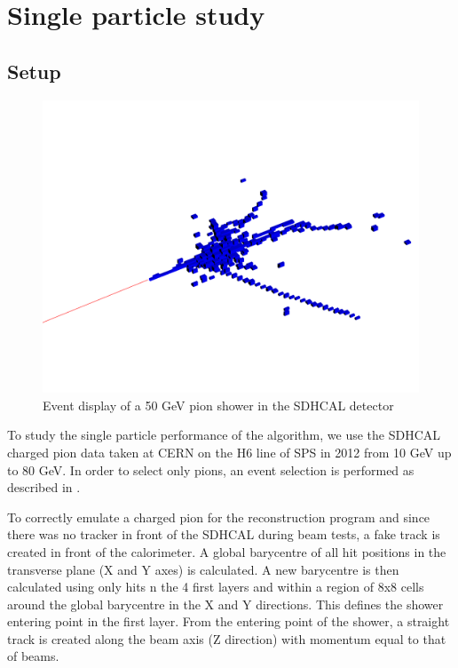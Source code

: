 \documentclass[cits]{JINST}
\begin{document}
\newpage
\section{Single particle study}
\label{SINGLE_PARTICLE_STUDY_SECTION}

\subsection{Setup}

\begin{figure}
  \vspace{-20pt}
  \begin{center}
    \includegraphics[width=\linewidth]{SingleParticleSetup.pdf}
  \end{center}
  \vspace{-10pt}
  \caption{\label{ARBOR_SINGLE_PARTICLE_SETUP} Event display of a 50 GeV pion shower in the SDHCAL detector}
\end{figure}

To study the single particle performance of the algorithm, we use the SDHCAL charged pion data taken at CERN on the H6 line of SPS in 2012 from 10 GeV up to 80 GeV. In order to select only pions, an event selection is performed as described in \cite{sdhcal-paper}.

To correctly emulate a charged pion for the reconstruction program and since there was no tracker in front of the SDHCAL during beam tests, a fake track is created in front of the calorimeter. A global barycentre of all hit positions in the transverse plane (X and Y axes) is calculated. A new barycentre is then calculated using only hits n the 4 first layers and within a region of 8x8 cells around the global barycentre in the X and Y directions. This defines the shower entering point in the first layer. From the entering point of the shower, a straight track is created along the beam axis (Z direction) with momentum equal to that of beams.
\end{document}
